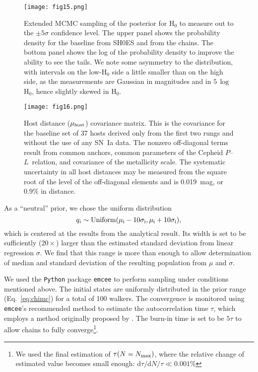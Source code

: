 \documentclass[12pt]{aastex631}
\newcommand{\PL}{$P$--$L$}
\begin{document}
\begin{figure}
\begin{center}
\texttt{[image: fig15.png]}
\end{center}
\caption{\label{fg:pct} Extended MCMC sampling of the posterior for H$_0$ to measure out to the $\pm 5\sigma$ confidence level.  The upper panel shows the probability density for the baseline from SH0ES and from the \citet{Planck:2018} chains.  The bottom panel shows the log of the probability density to improve the ability to see the tails.  We note some asymmetry to the distribution, with intervals on the low-H$_0$ side a little smaller than on the high side, as the measurements are Gaussian in magnitudes and in $5\,\log$\,H$_0$, hence slightly skewed in H$_0$.}
\end{figure}

\begin{figure}   
\begin{center}
\texttt{[image: fig16.png]}
\end{center}
\caption{\label{fg:covar} Host distance ($\mu_{\rm host}$) covariance matrix.  This is the covariance for the baseline set of 37 hosts derived only from the first two rungs and without the use of any SN~Ia data. The nonzero off-diagonal terms result from common anchors, common parameters of the Cepheid \PL\ relation, and covariance of the metallicity scale. The systematic uncertainty in all host distances may be measured from the square root of the level of the off-diagonal elements and is 0.019~mag, or 0.9\% in distance.}
\end{figure}

\clearpage

As a ``neutral'' prior, we chose the uniform distribution
\begin{equation}
    q_i \sim \rm{Uniform}(\mu_i-10\sigma_i,\mu_i+10\sigma_i),
\end{equation}
which is centered at the results from the analytical result. Its width is set to be sufficiently ($20\times$) larger than the estimated standard deviation from linear regression $\sigma$. We find that this range is more than enough to allow determination of median and standard deviation of the resulting population from $\mu$ and $\sigma$.

We used the \texttt{Python} package \texttt{emcee} \citep[][]{emcee_2013} to perform sampling under conditions mentioned above. The initial states are uniformly distributed in the prior range (Eq.~\ref{eq:chimc}) for a total of 100 walkers.  The convergence is monitored using \texttt{emcee}'s recommended method to estimate the autocorrelation time $\tau$, which employs a method originally proposed by \cite{Goodman_2010_autocorr}. The burn-in time is set to be $5\tau$ to allow chains to fully converge\footnote{We used the final estimation of $\tau(N=N_{\rm max})$, where the relative change of estimated value becomes small enough: $\mathrm d\tau/\mathrm dN/\tau \ll 0.001\%$}.
\end{document}
